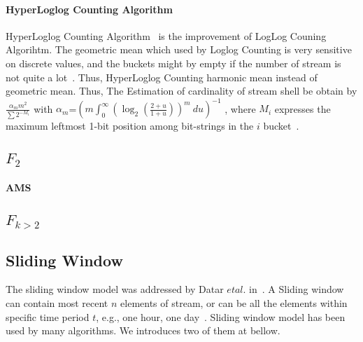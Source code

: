 \paragraph{HyperLoglog Counting Algorithm}

HyperLoglog Counting Algorithm~\cite{flajolet2007hyperloglog} is the improvement
of LogLog Couning Algorihtm. The geometric mean which used by Loglog Counting is
very sensitive on discrete values, and the buckets might by empty if the number
of stream is not quite a lot~\cite{flajolet2007hyperloglog}. Thus, HyperLoglog
Counting harmonic mean instead of geometric mean. Thus, The Estimation of
cardinality of stream shell be obtain by $\frac{\alpha_m m^2 }{\sum 2^{-M_i}}$
with $\alpha_m$=$(m \int_0^\infty(\log_2(\frac{2+u}{1+u}))^m\ du)^{-1}$ , where
$M_i$ expresses the maximum leftmost 1-bit position among bit-strings in the $i$
bucket~\cite{flajolet2007hyperloglog}.

\subsection{ $F_2$}
\paragraph{AMS}

\subsection{$F_{k>2}$}

\subsection{Sliding Window}
The sliding window model was addressed by Datar $et al.$
in~\cite{datar2002maintaining}. A Sliding window can contain most recent $n$
elements of stream, or can be all the elements within specific time period $t$,
e.g., one hour, one day~\cite{leskovec2014mining}. Sliding window model has been
used by many algorithms. We introduces two of them at bellow.

